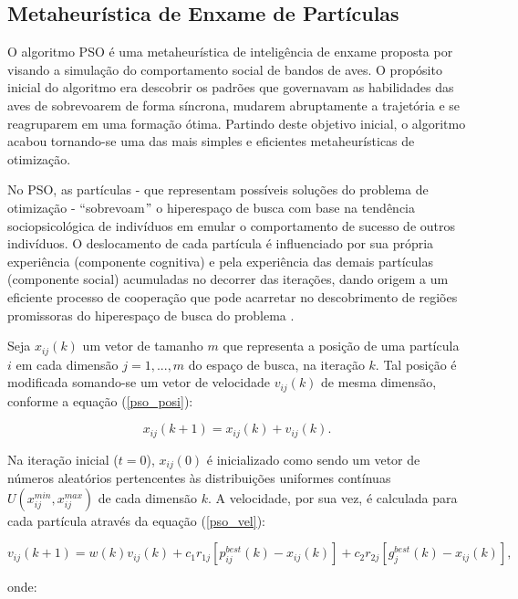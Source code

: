 \documentclass[
	12pt,				%
	openany,			%
	twoside,			%
	a4paper,			%
	chapter=TITLE,		%
	section=Title,		%
	subsection=Title,	%
	subsubsection=Title,%
	english,			%
	french,				%
	spanish,			%
	brazil			%
	]{abntex2}
\begin{document}
\begin{ERRATA}
\section{Metaheurística de Enxame de Partículas}

O algoritmo PSO é uma metaheurística de inteligência de enxame proposta por  visando a simulação do comportamento social de bandos de aves. O propósito inicial do algoritmo era descobrir os padrões que governavam as habilidades das aves de sobrevoarem de forma síncrona, mudarem abruptamente a trajetória e se reagruparem em uma formação ótima. Partindo deste objetivo inicial, o algoritmo acabou tornando-se uma das mais simples e eficientes metaheurísticas de otimização.

No PSO, as partículas - que representam possíveis soluções do problema de otimização - ``sobrevoam$"$ o hiperespaço de busca com base na tendência sociopsicológica de indivíduos em emular o comportamento de sucesso de outros indivíduos. O deslocamento de cada partícula é influenciado por sua própria experiência (componente cognitiva) e pela experiência das demais partículas (componente social) acumuladas no decorrer das iterações, dando origem a um eficiente processo de cooperação que pode acarretar no descobrimento de regiões promissoras do hiperespaço de busca do problema \cite{compint}. 

Seja $x_{ij}(k)$ um vetor de tamanho $m$ que representa a posição de uma partícula $i$ em cada dimensão $j = 1,...,m$ do espaço de busca, na iteração $k$. Tal posição é modificada somando-se um vetor de velocidade $v_{ij}(k)$ de mesma dimensão, conforme a equação (\ref{pso_posi}):

\begin{equation}
\label{pso_posi}
x_{ij}(k+1) = x_{ij}(k)+v_{ij}(k).
\end{equation}

Na iteração inicial ($t=0$), $x_{ij}(0)$ é inicializado como sendo um vetor de números aleatórios pertencentes às distribuições uniformes contínuas $U(x_{ij}^{min},x_{ij}^{max})$ de cada dimensão $k$. A velocidade, por sua vez, é calculada para cada partícula através da equação (\ref{pso_vel}):

\begin{equation} \label{pso_vel}
v_{ij}(k+1) = w(k) v_{ij}(k)+c_1r_{1j}[p^{best}_{ij}(k)-x_{ij}(k)]+c_2r_{2j}[g^{best}_{j}(k)-x_{ij}(k)],
\end{equation}

\noindent onde:


\end{ERRATA}
\end{document}
